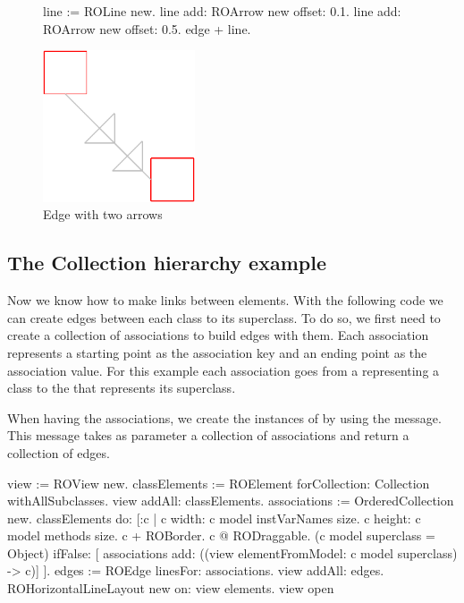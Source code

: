 \documentclass[a4paper,10pt,twoside]{book}
\begin{document}
\begin{figure}[H]
      \begin{minipage}[t]{0.5\textwidth}
      \vspace{0pt}
     \begin{code}{}
line := ROLine new.
line add: ROArrow new offset: 0.1.
line add: ROArrow new offset: 0.5.
edge + line. \end{code}
   \end{minipage}
   \hfill
   \begin{minipage}[t]{0.4\textwidth}
      \vspace{0pt} \raggedright
       \centering
		\includegraphics[width=0.4\textwidth]{twoArrowEdge}
   \end{minipage}
\caption{Edge with two arrows}
\label{fig:twoArrowEdge}
\end{figure} 

\subsection*{The Collection hierarchy example}
Now we know how to make links between elements. With the following code we can create edges between each class to its superclass. 
To do so, we first need to create a collection of associations to build edges with them. Each association represents a starting point as the association key and an ending point as the association value. For this example each association goes from a  representing a class to the  that represents its superclass. 

When having the associations, we create the instances of  by using the  message. This message takes as parameter a collection of associations and return a collection of edges.


\begin{code}{}
view := ROView new.
classElements := ROElement forCollection: Collection withAllSubclasses.
view addAll: classElements.
associations := OrderedCollection new.
classElements do: [:c | 
	c width: c model instVarNames size.
	c height: c model methods size.
	c + ROBorder. 
	c @ RODraggable.	
	(c model superclass = Object)
		ifFalse: [ associations add: ((view elementFromModel: c model superclass) -> c)]	
	 ].
edges := ROEdge linesFor: associations.
view addAll: edges.
ROHorizontalLineLayout new on: view elements.
view open
\end{code}
\end{document}

